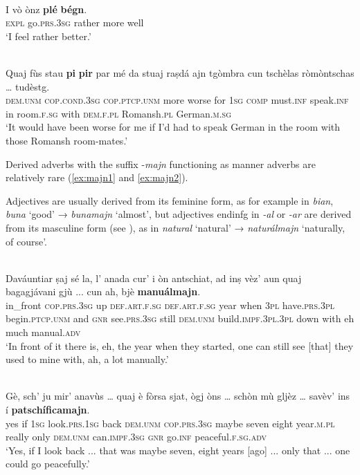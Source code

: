 \ea
\label{}
\\
\gll  I vò ònz \textbf{plé} \textbf{bégn}. \\
     \textsc{expl} go.\textsc{prs.3sg} rather more well\\
\glt `I feel rather better.'
\z

\ea
\label{}
\\
\gll    Quaj fùs stau \textbf{pi} \textbf{pir} par mé da stuaj raṣdá ajn tgòmbra cun tschèlas ròmòntschas … tudèstg.\\
\textsc{dem.unm} \textsc{cop.cond.3sg} \textsc{cop.ptcp.unm} more worse for \textsc{1sg} \textsc{comp} must.\textsc{inf} speak.\textsc{inf} in room.\textsc{f.sg} with \textsc{dem.f.pl} Romansh.\textsc{pl} {} German.\textsc{m.sg}\\
\glt `It would have been worse for me if I'd had to speak German in the room with those Romansh room-mates.'
\z

Derived adverbs with the suffix -\textit{majn} functioning as manner adverbs are relatively rare (\ref{ex:majn1} and \ref{ex:majn2}).

Adjectives are usually derived from its feminine form, as for example in \textit{bian}, \textit{buna} `good' → \textit{bunamajn} `almost', but adjectives endinfg in \textit{-al} or \textit{-ar} are derived from its masculine form (see \citet[494]{Spescha1989}), as in \textit{natural} `natural' → \textit{naturálmajn} `naturally, of course'.

\ea
\label{ex:majn1}
\\
\gll Daváuntiar ṣaj sé la, l’ anada cur' i òn antschiat, ad inṣ vèz’ aun quaj bagagjávani gjù ... cun ah, bjè \textbf{manuálmajn}.   \\
in\_front  \textsc{cop.prs.3sg} up \textsc{def.art.f.sg} \textsc{def.art.f.sg} year when \textsc{3pl} have.\textsc{prs.3pl} begin.\textsc{ptcp.unm} and \textsc{gnr}  see.\textsc{prs.3sg} still  \textsc{dem.unm} build.\textsc{impf.3pl.3pl} down {} with eh much manual.\textsc{adv}\\
\glt `In front of it there is, eh, the year when they started, one can still see [that] they used to mine with, ah, a lot manually.'
\z

\ea
\label{ex:majn2}
\\
\gll Gè, sch’ ju mir’ anavùs … quaj è fòrsa sjat, ògj òns … schòn mù gljèz … savèv’ ins í \textbf{patschíficamajn}.   \\
yes if \textsc{1sg} look.\textsc{prs.1sg} back {} \textsc{dem.unm} \textsc{cop.prs.3sg} maybe seven eight year.\textsc{m.pl} {} really only \textsc{dem.unm} {} can.\textsc{impf.3sg} \textsc{gnr} go.\textsc{inf} peaceful.\textsc{f.sg.adv}\\
\glt `Yes, if I look back ... that was maybe seven, eight years [ago] ... only that ... one could go peacefully.'
\z


